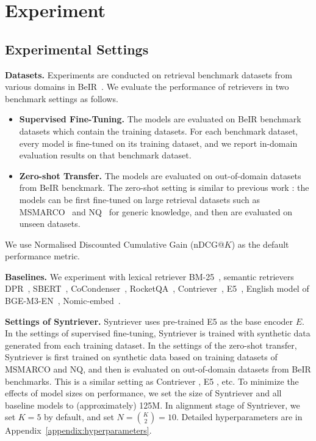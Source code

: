 \section{Experiment}
\subsection{Experimental Settings}

\textbf{Datasets.} Experiments are conducted on retrieval benchmark datasets from various domains in BeIR~\cite{thakur2021beir}. We evaluate the performance of retrievers in two benchmark settings as follows.
\begin{itemize}
    \item \textbf{Supervised Fine-Tuning.} The models are evaluated on BeIR benchmark datasets which contain the training datasets. For each benchmark dataset, every model is fine-tuned on its training dataset, and we report in-domain evaluation results on that benchmark dataset.

    \item \textbf{Zero-shot Transfer.} The models are evaluated on out-of-domain datasets from BeIR benckmark. The zero-shot setting is similar to previous work \cite{izacard2021unsupervised,wang2022text}: the models can be first fine-tuned on large retrieval datasets such as MSMARCO~\cite{nguyen2016ms} and NQ~\cite{kwiatkowski2019natural} for generic knowledge, and then are evaluated on unseen datasets.
\end{itemize}
We use Normalised Discounted Cumulative Gain (nDCG@$K$) as the default performance metric.

\noindent\textbf{Baselines.} We experiment with lexical retriever BM-25~\cite{robertson2009probabilistic}, semantic retrievers DPR~\cite{karpukhin2020dense}, SBERT~\cite{reimers2019sentence}, CoCondenser~\cite{gao2022unsupervised}, RocketQA~\cite{ren2021rocketqav2}, 
Contriever~\cite{izacard2021unsupervised}, E5~\cite{wang2022text}, English model of BGE-M3-EN~\cite{chen2024bge}, Nomic-embed~\cite{nussbaum2402nomic}. 

\noindent\textbf{Settings of Syntriever.} Syntriever uses pre-trained E5 \cite{wang2022text} as the base encoder $E$. In the settings of supervised fine-tuning, Syntriever is trained with synthetic data generated from each training dataset. In the settings of the zero-shot transfer, Syntriever is first trained on synthetic data based on training datasets of MSMARCO and NQ, and then is evaluated on out-of-domain datasets from BeIR benchmarks. This is a similar setting as Contriever \cite{izacard2021unsupervised}, E5 \cite{wang2022text}, etc. To minimize the effects of model sizes on performance, we set the size of Syntriever and all baseline models to (approximately) 125M. In alignment stage of Syntriever, we set $K=5$ by default, and set $N={K\choose 2}=10$. Detailed hyperparameters are in Appendix~\ref{appendix:hyperparameters}.

